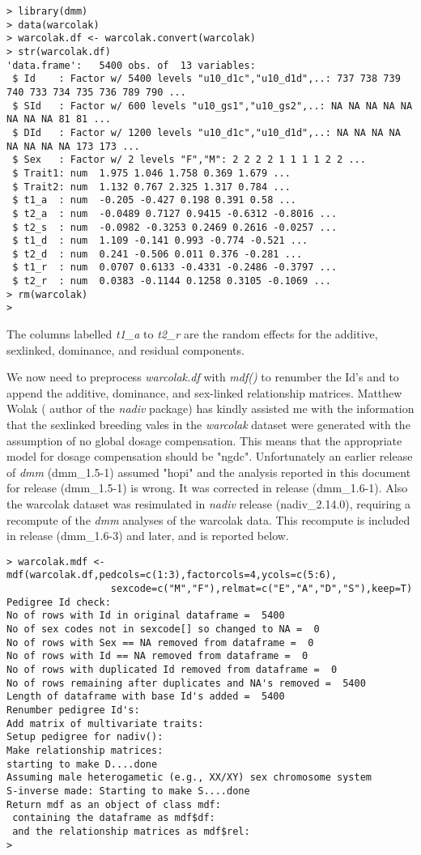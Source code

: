 \documentclass[titlepage]{article}  %
\begin{document}
\begin{verbatim}
> library(dmm)
> data(warcolak)
> warcolak.df <- warcolak.convert(warcolak)
> str(warcolak.df)
'data.frame':	5400 obs. of  13 variables:
 $ Id    : Factor w/ 5400 levels "u10_d1c","u10_d1d",..: 737 738 739 740 733 734 735 736 789 790 ...
 $ SId   : Factor w/ 600 levels "u10_gs1","u10_gs2",..: NA NA NA NA NA NA NA NA 81 81 ...
 $ DId   : Factor w/ 1200 levels "u10_d1c","u10_d1d",..: NA NA NA NA NA NA NA NA 173 173 ...
 $ Sex   : Factor w/ 2 levels "F","M": 2 2 2 2 1 1 1 1 2 2 ...
 $ Trait1: num  1.975 1.046 1.758 0.369 1.679 ...
 $ Trait2: num  1.132 0.767 2.325 1.317 0.784 ...
 $ t1_a  : num  -0.205 -0.427 0.198 0.391 0.58 ...
 $ t2_a  : num  -0.0489 0.7127 0.9415 -0.6312 -0.8016 ...
 $ t2_s  : num  -0.0982 -0.3253 0.2469 0.2616 -0.0257 ...
 $ t1_d  : num  1.109 -0.141 0.993 -0.774 -0.521 ...
 $ t2_d  : num  0.241 -0.506 0.011 0.376 -0.281 ...
 $ t1_r  : num  0.0707 0.6133 -0.4331 -0.2486 -0.3797 ...
 $ t2_r  : num  0.0383 -0.1144 0.1258 0.3105 -0.1069 ...
> rm(warcolak)
> 
\end{verbatim}
The columns labelled {\em t1\_a} to {\em t2\_r} are the random effects for the additive, sexlinked, dominance, and residual components.

  We now need to preprocess {\em warcolak.df} with {\em mdf()} to renumber the Id's and to append the additive, dominance, and sex-linked relationship matrices. Matthew Wolak ( author of the {\em nadiv} package) has kindly assisted me with the information that the sexlinked breeding vales in the {\em warcolak} dataset were generated with the assumption of no global dosage compensation. This means that the appropriate model for dosage compensation should be "ngdc". Unfortunately an earlier release of {\em dmm} (dmm\_1.5-1) assumed "hopi" and the analysis reported in this document for release (dmm\_1.5-1) is wrong. It was corrected in release (dmm\_1.6-1). Also the warcolak dataset was resimulated in {\em nadiv} release (nadiv\_2.14.0), requiring a recompute of the {\em dmm} analyses of the warcolak data. This recompute is included in release  (dmm\_1.6-3) and later, and is reported below.

\begin{verbatim}
> warcolak.mdf <- mdf(warcolak.df,pedcols=c(1:3),factorcols=4,ycols=c(5:6),
                  sexcode=c("M","F"),relmat=c("E","A","D","S"),keep=T)
Pedigree Id check:
No of rows with Id in original dataframe =  5400 
No of sex codes not in sexcode[] so changed to NA =  0 
No of rows with Sex == NA removed from dataframe =  0 
No of rows with Id == NA removed from dataframe =  0 
No of rows with duplicated Id removed from dataframe =  0 
No of rows remaining after duplicates and NA's removed =  5400 
Length of dataframe with base Id's added =  5400 
Renumber pedigree Id's:
Add matrix of multivariate traits:
Setup pedigree for nadiv():
Make relationship matrices:
starting to make D....done 
Assuming male heterogametic (e.g., XX/XY) sex chromosome system
S-inverse made: Starting to make S....done 
Return mdf as an object of class mdf:
 containing the dataframe as mdf$df:
 and the relationship matrices as mdf$rel:
> 
\end{verbatim}
 
\end{document}
